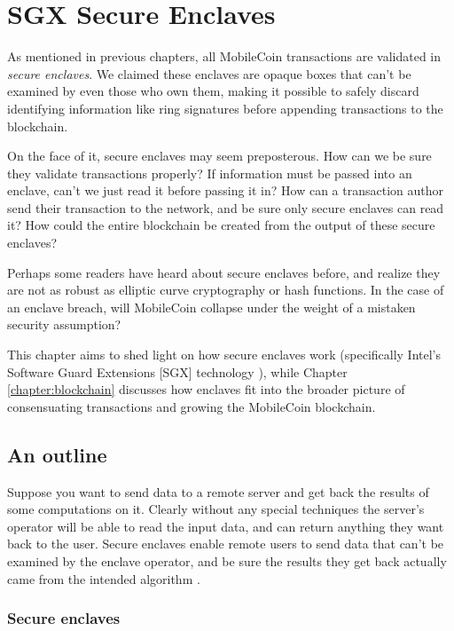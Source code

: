 \chapter{SGX Secure Enclaves}
\label{chapter:enclaves}

As mentioned in previous chapters, all MobileCoin transactions are validated in {\em secure enclaves}. We claimed these enclaves are opaque boxes that can't be examined by even those who own them, making it possible to safely discard identifying information like ring signatures before appending transactions to the blockchain.

On the face of it, secure enclaves may seem preposterous. How can we be sure they validate transactions properly? If information must be passed into an enclave, can't we just read it before passing it in? How can a transaction author send their transaction to the network, and be sure only secure enclaves can read it? How could the entire blockchain be created from the output of these secure enclaves?

Perhaps some readers have heard about secure enclaves before, and realize they are not as robust as elliptic curve cryptography or hash functions. In the case of an enclave breach, will MobileCoin collapse under the weight of a mistaken security assumption?

This chapter aims to shed light on how secure enclaves work (specifically Intel's Software Guard Extensions [SGX] technology \cite{kudelski-sgx-secure-enclaves-review, intel-sgx-explained-advanced}), while Chapter \ref{chapter:blockchain} discusses how enclaves fit into the broader picture of consensuating transactions and growing the MobileCoin blockchain.



\section{An outline}
\label{sec:secure-enclave-outline}

Suppose you want to send data to a remote server and get back the results of some computations on it. Clearly without any special techniques the server's operator will be able to read the input data, and can return anything they want back to the user. Secure enclaves enable remote users to send data that can't be examined by the enclave operator, and be sure the results they get back actually came from the intended algorithm \cite{intel-sgx-explained-advanced}.


\subsection{Secure enclaves}
\label{subsec:simple-enclave-secure-enclave}

